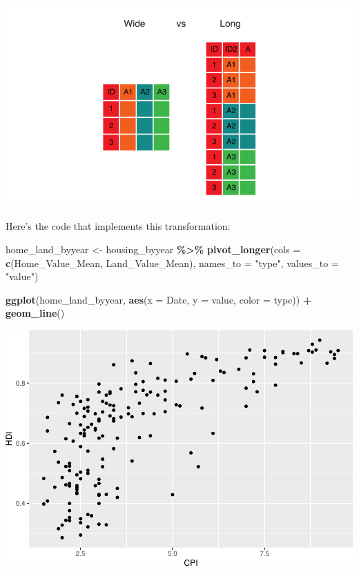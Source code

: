 \documentclass[
]{book}
\newenvironment{Shaded}{\begin{snugshade}}{\end{snugshade}}
\newcommand{\DataTypeTok}[1]{\textcolor[rgb]{0.13,0.29,0.53}{#1}}
\newcommand{\KeywordTok}[1]{\textcolor[rgb]{0.13,0.29,0.53}{\textbf{#1}}}
\newcommand{\NormalTok}[1]{#1}
\newcommand{\OperatorTok}[1]{\textcolor[rgb]{0.81,0.36,0.00}{\textbf{#1}}}
\newcommand{\StringTok}[1]{\textcolor[rgb]{0.31,0.60,0.02}{#1}}
\begin{document}
\includegraphics{R/Rgraphics/images/wide_vs_long.png}

Here's the code that implements this transformation:

\begin{Shaded}
\begin{Highlighting}[]
\NormalTok{home\_land\_byyear \textless{}{-}}\StringTok{ }
\StringTok{    }\NormalTok{housing\_byyear }\OperatorTok{\%\textgreater{}\%}
\StringTok{    }\KeywordTok{pivot\_longer}\NormalTok{(}\DataTypeTok{cols =} \KeywordTok{c}\NormalTok{(Home\_Value\_Mean, Land\_Value\_Mean),}
                 \DataTypeTok{names\_to =} \StringTok{"type"}\NormalTok{,}
                 \DataTypeTok{values\_to =} \StringTok{"value"}\NormalTok{)}
                          
\KeywordTok{ggplot}\NormalTok{(home\_land\_byyear, }\KeywordTok{aes}\NormalTok{(}\DataTypeTok{x =}\NormalTok{ Date, }\DataTypeTok{y =}\NormalTok{ value, }\DataTypeTok{color =}\NormalTok{ type)) }\OperatorTok{+}
\StringTok{  }\KeywordTok{geom\_line}\NormalTok{()}
\end{Highlighting}
\end{Shaded}

\includegraphics{R/Rgraphics/figures/unnamed-chunk-202-1.pdf}
\end{document}
